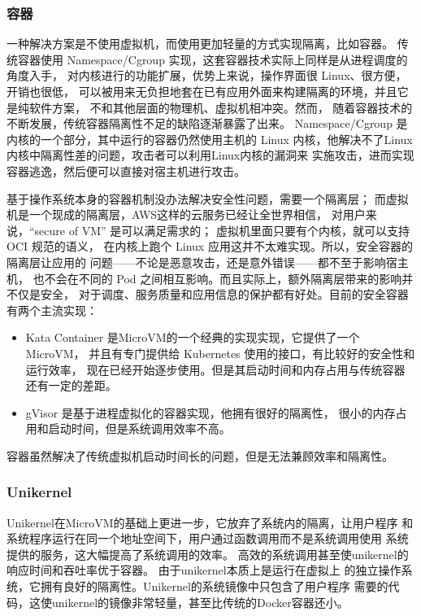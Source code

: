 \documentclass[UTF8,fontset=none,linespread=1.15]{ctexart}
\begin{document}
\subsubsection{容器}
一种解决方案是不使用虚拟机，而使用更加轻量的方式实现隔离，比如容器。
传统容器使用 Namespace/Cgroup 实现，这套容器技术实际上同样是从进程调度的角度入手，
对内核进行的功能扩展，优势上来说，操作界面很 Linux、很方便，开销也很低，
可以被用来无负担地套在已有应用外面来构建隔离的环境，并且它是纯软件方案，
不和其他层面的物理机、虚拟机相冲突。然而，
随着容器技术的不断发展，传统容器隔离性不足的缺陷逐渐暴露了出来。
Namespace/Cgroup 是内核的一个部分，其中运行的容器仍然使用主机的 Linux 内核，他解决不了Linux内核中隔离性差的问题，攻击者可以利用Linux内核的漏洞来
实施攻击，进而实现容器逃逸，然后便可以直接对宿主机进行攻击。

基于操作系统本身的容器机制没办法解决安全性问题，需要一个隔离层；
而虚拟机是一个现成的隔离层，AWS这样的云服务已经让全世界相信，
对用户来说，“secure of VM” 是可以满足需求的；
虚拟机里面只要有个内核，就可以支持 OCI 规范的语义，
在内核上跑个 Linux 应用这并不太难实现。所以，安全容器的隔离层让应用的
问题——不论是恶意攻击，还是意外错误——都不至于影响宿主机，
也不会在不同的 Pod 之间相互影响。而且实际上，额外隔离层带来的影响并不仅是安全，
对于调度、服务质量和应用信息的保护都有好处。目前的安全容器有两个主流实现：
\begin{itemize}
\item Kata Container 是MicroVM的一个经典的实现实现，它提供了一个MicroVM，
并且有专门提供给 Kubernetes 使用的接口，有比较好的安全性和运行效率，
现在已经开始逐步使用。但是其启动时间和内存占用与传统容器还有一定的差距。
\item  gVisor 是基于进程虚拟化的容器实现，他拥有很好的隔离性，
很小的内存占用和启动时间，但是系统调用效率不高。
\end{itemize}

容器虽然解决了传统虚拟机启动时间长的问题，但是无法兼顾效率和隔离性。

\subsubsection{Unikernel}
Unikernel在MicroVM的基础上更进一步，它放弃了系统内的隔离，让用户程序
和系统程序运行在同一个地址空间下，用户通过函数调用而不是系统调用使用
系统提供的服务，这大幅提高了系统调用的效率。
高效的系统调用甚至使unikernel的响应时间和吞吐率优于容器。
由于unikernel本质上是运行在虚拟上
的独立操作系统，它拥有良好的隔离性。Unikernel的系统镜像中只包含了用户程序
需要的代码，这使unikernel的镜像非常轻量，甚至比传统的Docker容器还小。
\end{document}
